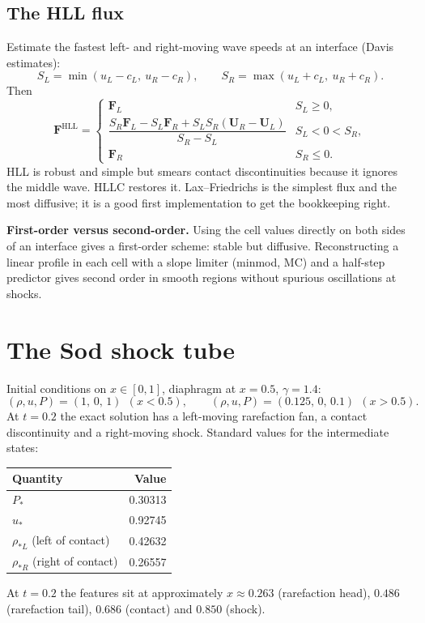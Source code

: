 \subsection*{The HLL flux}
Estimate the fastest left- and right-moving wave speeds at an interface (Davis estimates):
\[
S_L=\min(u_L-c_L,\ u_R-c_R),\qquad S_R=\max(u_L+c_L,\ u_R+c_R).
\]
Then
\[
\mathbf F^{\mathrm{HLL}}=
\begin{cases}
\mathbf F_L & S_L\ge0,\\[3pt]
\dfrac{S_R\mathbf F_L-S_L\mathbf F_R+S_LS_R(\mathbf U_R-\mathbf U_L)}{S_R-S_L} & S_L<0<S_R,\\[10pt]
\mathbf F_R & S_R\le0.
\end{cases}
\]
HLL is robust and simple but smears contact discontinuities because it ignores the middle wave. HLLC restores it. Lax--Friedrichs is the simplest flux and the most diffusive; it is a good first implementation to get the bookkeeping right.

\begin{keyidea}
\textbf{First-order versus second-order.} Using the cell values directly on both sides of an interface gives a first-order scheme: stable but diffusive. Reconstructing a linear profile in each cell with a slope limiter (minmod, MC) and a half-step predictor gives second order in smooth regions without spurious oscillations at shocks.
\end{keyidea}

\section{The Sod shock tube}
Initial conditions on $x\in[0,1]$, diaphragm at $x=0.5$, $\gamma=1.4$:
\[
(\rho,u,P)=(1,\,0,\,1)\ \ (x<0.5),\qquad (\rho,u,P)=(0.125,\,0,\,0.1)\ \ (x>0.5).
\]
At $t=0.2$ the exact solution has a left-moving rarefaction fan, a contact discontinuity and a right-moving shock. Standard values for the intermediate states:
\begin{center}
\begin{tabular}{@{}lr@{}}
\toprule
Quantity & Value \\ \midrule
$P_*$ & 0.30313 \\
$u_*$ & 0.92745 \\
$\rho_{*L}$ (left of contact) & 0.42632 \\
$\rho_{*R}$ (right of contact) & 0.26557 \\
\bottomrule
\end{tabular}
\end{center}
At $t=0.2$ the features sit at approximately $x\approx0.263$ (rarefaction head), $0.486$ (rarefaction tail), $0.686$ (contact) and $0.850$ (shock).

